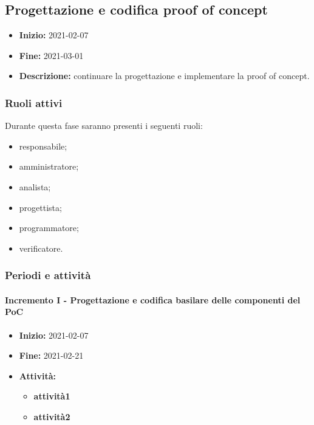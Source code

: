 
\subsection{Progettazione e codifica proof of concept} \label{_pianificazioneProgettazioneCodificaPoC}
\begin{itemize}
    \item []\textbf{Inizio:} 2021-02-07
    \item []\textbf{Fine:} 2021-03-01
    \item []\textbf{Descrizione:} continuare la progettazione e implementare la proof of concept.
\end{itemize}

\subsubsection{Ruoli attivi}
Durante questa fase saranno presenti i seguenti ruoli:
\begin{itemize}
    \item responsabile;
    \item amministratore;
    \item analista;
    \item progettista;
    \item programmatore;
    \item verificatore.
\end{itemize}

\subsubsection{Periodi e attività}

\paragraph[Incremento I]{Incremento I - \textnormal{Progettazione e codifica basilare delle componenti del PoC}}
\begin{itemize}
    \item [] \textbf{Inizio:} 2021-02-07
    \item [] \textbf{Fine:} 2021-02-21
    \item [] \textbf{Attività:}
          \begin{itemize}
            \item \textbf{attività1}
            \item \textbf{attività2}
          \end{itemize}
\end{itemize}

